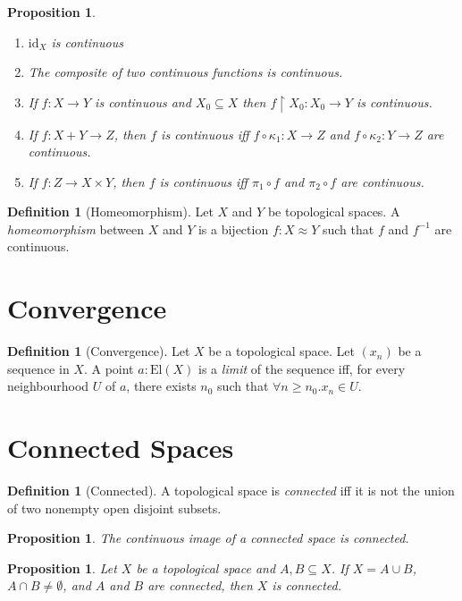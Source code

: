 \documentclass{book}
\newtheorem{prop}[ax]{Proposition}
\theoremstyle{definition}
\newtheorem{df}[ax]{Definition}
\newcommand{\El}[1]{\ensuremath{\mathrm{El} \left( {#1} \right)}}
\newcommand{\id}[1]{\ensuremath{\mathrm{id}_{#1}}}
\newcommand{\inv}[1]{\ensuremath{{#1}^{-1}}}
\begin{document}
\begin{prop}
\begin{enumerate}
\item $\id{X}$ is continuous
\item The composite of two continuous functions is continuous.
\item If $f : X \rightarrow Y$ is continuous and $X_0 \subseteq X$ then $f \restriction X_0 : X_0 \rightarrow Y$ is continuous.
\item If $f : X + Y \rightarrow Z$, then $f$ is continuous iff $f \circ \kappa_1 : X \rightarrow Z$ and $f \circ \kappa_2 : Y \rightarrow Z$ are continuous.
\item If $f : Z \rightarrow X \times Y$, then $f$ is continuous iff $\pi_1 \circ f$ and $\pi_2 \circ f$ are continuous.
\end{enumerate}
\end{prop}

\begin{df}[Homeomorphism]
Let $X$ and $Y$ be topological spaces. A \emph{homeomorphism} between $X$ and $Y$ is a bijection $f : X \approx Y$ such that $f$ and $\inv{f}$ are continuous.
\end{df}

\section{Convergence}

\begin{df}[Convergence]
Let $X$ be a topological space. Let $(x_n)$ be a sequence in $X$. A point $a : \El{X}$ is a \emph{limit} of the sequence iff, for every neighbourhood $U$ of $a$, there exists $n_0$ such that $\forall n \geq n_0. x_n \in U$.
\end{df}

\section{Connected Spaces}

\begin{df}[Connected]
A topological space is \emph{connected} iff it is not the union of two nonempty open disjoint subsets.
\end{df}

\begin{prop}
The continuous image of a connected space is connected.
\end{prop}

\begin{prop}
Let $X$ be a topological space and $A,B \subseteq X$. If $X = A \cup B$, $A \cap B \neq \emptyset$, and $A$ and $B$ are connected, then $X$ is connected.
\end{prop}
\end{document}
